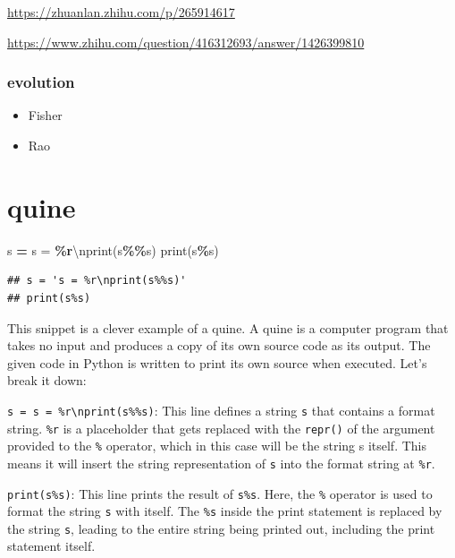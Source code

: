 \documentclass[
]{book}
\newenvironment{Shaded}{\begin{snugshade}}{\end{snugshade}}
\newcommand{\BuiltInTok}[1]{#1}
\newcommand{\CharTok}[1]{\textcolor[rgb]{0.31,0.60,0.02}{#1}}
\newcommand{\NormalTok}[1]{#1}
\newcommand{\OperatorTok}[1]{\textcolor[rgb]{0.81,0.36,0.00}{\textbf{#1}}}
\newcommand{\SpecialCharTok}[1]{\textcolor[rgb]{0.81,0.36,0.00}{\textbf{#1}}}
\newcommand{\StringTok}[1]{\textcolor[rgb]{0.31,0.60,0.02}{#1}}
\providecommand{\tightlist}{%
  \setlength{\itemsep}{0pt}\setlength{\parskip}{0pt}}
\theoremstyle{definition}
\theoremstyle{definition}
\theoremstyle{definition}
\theoremstyle{definition}
\theoremstyle{remark}
\begin{document}
\url{https://zhuanlan.zhihu.com/p/265914617}

\url{https://www.zhihu.com/question/416312693/answer/1426399810}

\subsection{evolution}\label{evolution}

\begin{itemize}
\tightlist
\item
  Fisher
\item
  Rao
\end{itemize}

\chapter{quine}\label{quine}

\begin{Shaded}
\begin{Highlighting}[]
\NormalTok{s }\OperatorTok{=} \StringTok{\textquotesingle{}s = }\SpecialCharTok{\%r}\CharTok{\textbackslash{}n}\StringTok{print(s}\SpecialCharTok{\%\%}\StringTok{s)\textquotesingle{}}
\BuiltInTok{print}\NormalTok{(s}\OperatorTok{\%}\NormalTok{s)}
\end{Highlighting}
\end{Shaded}

\begin{verbatim}
## s = 's = %r\nprint(s%%s)'
## print(s%s)
\end{verbatim}

This snippet is a clever example of a quine. A quine is a computer program that takes no input and produces a copy of its own source code as its output. The given code in Python is written to print its own source when executed. Let's break it down:

\texttt{s\ =\ \textquotesingle{}s\ =\ \%r\textbackslash{}nprint(s\%\%s)\textquotesingle{}}: This line defines a string \texttt{s} that contains a format string. \texttt{\%r} is a placeholder that gets replaced with the \texttt{repr()} of the argument provided to the \texttt{\%} operator, which in this case will be the string s itself. This means it will insert the string representation of \texttt{s} into the format string at \texttt{\%r}.

\texttt{print(s\%s)}: This line prints the result of \texttt{s\%s}. Here, the \texttt{\%} operator is used to format the string \texttt{s} with itself. The \texttt{\%s} inside the print statement is replaced by the string \texttt{s}, leading to the entire string being printed out, including the print statement itself.
\end{document}
